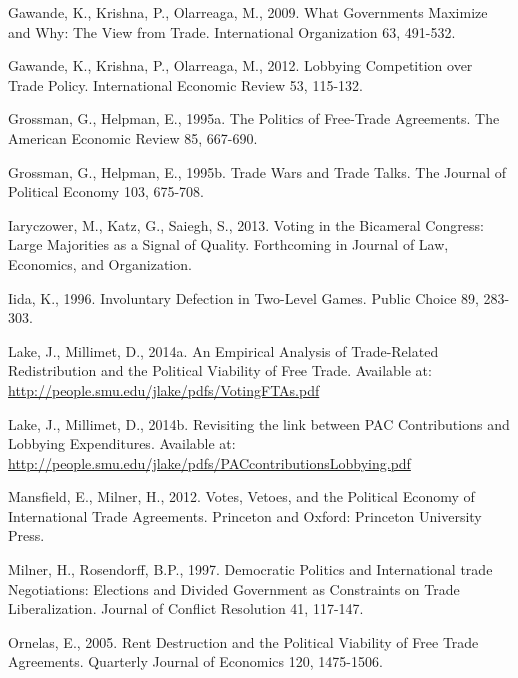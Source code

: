 \documentclass[12pt]{article}
\begin{document}
\begin{list}{}{\setlength{\leftmargin}{0.3in}\setlength{\rightmargin}{0.0in}\setlength{\itemindent}{-0.3in}\setlength{\itemsep}{0.0in}}
	\item Gawande, K., Krishna, P., Olarreaga, M., 2009. What Governments Maximize and Why: The View from Trade. International Organization 63, 491-532.

	\item Gawande, K., Krishna, P., Olarreaga, M., 2012. Lobbying Competition over Trade Policy. International Economic Review 53, 115-132.

	\item Grossman, G., Helpman, E., 1995a. The Politics of Free-Trade Agreements. The American Economic Review 85, 667-690.

	\item Grossman, G., Helpman, E., 1995b. Trade Wars and Trade Talks. The Journal of Political Economy 103, 675-708.

	\item Iaryczower, M., Katz, G., Saiegh, S., 2013. Voting in the Bicameral Congress: Large Majorities as a Signal of Quality. Forthcoming in Journal of Law, Economics, and Organization.

  \item Iida, K., 1996. Involuntary Defection in Two-Level Games. Public Choice 89, 283-303.
  
	\item Lake, J., Millimet, D., 2014a. An Empirical Analysis of Trade-Related Redistribution and the Political Viability of Free Trade. Available at: \url{http://people.smu.edu/jlake/pdfs/VotingFTAs.pdf}

	\item Lake, J., Millimet, D., 2014b. Revisiting the link between PAC Contributions and Lobbying Expenditures. Available at: \url{http://people.smu.edu/jlake/pdfs/PACcontributionsLobbying.pdf}

	\item Mansfield, E., Milner, H., 2012. Votes, Vetoes, and the Political Economy of International Trade Agreements. Princeton and Oxford: Princeton  University Press.

	\item Milner, H., Rosendorff, B.P., 1997. Democratic Politics and International trade Negotiations: Elections and Divided Government as Constraints on Trade Liberalization. Journal of Conflict Resolution 41, 117-147.

	\item Ornelas, E., 2005. Rent Destruction and the Political Viability of Free Trade Agreements. Quarterly Journal of Economics 120, 1475-1506.

  

\end{list}
\end{document}
